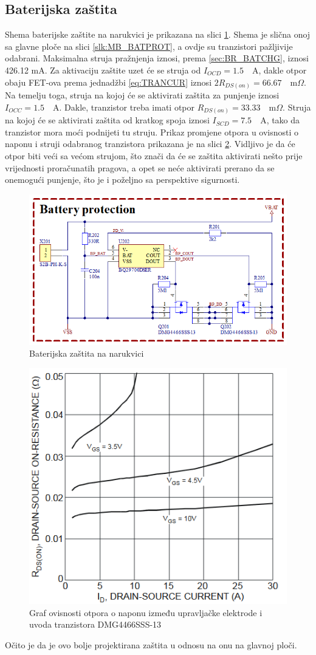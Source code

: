 \subsection{Baterijska zaštita}
\sloppy Shema baterijske zaštite na narukvici je prikazana na slici \ref{slk:BR_BATPROT}. Shema je slična onoj sa glavne ploče na slici \ref{slk:MB_BATPROT}, a ovdje su tranzistori pažljivije odabrani. Maksimalna struja pražnjenja iznosi, prema \ref{sec:BR_BATCHG}, iznosi 426.12 mA. Za aktivaciju zaštite uzet će se struja od $I_{OCD}=1.5\quad \textrm{A}$, dakle otpor obaju FET-ova prema jednadžbi \ref{eq:TRANCUR} iznosi ${2R_{DS(on)}=66.67\quad \textrm{m}\Omega}$. Na temelju toga, struja na kojoj će se aktivirati zaštita za punjenje iznosi $I_{OCC}=1.5\quad \textrm{A}$. Dakle, tranzistor treba imati otpor $R_{DS(on)}=33.33\quad \textrm{m}\Omega$. Struja na kojoj će se aktivirati zaštita od kratkog spoja iznosi $I_{SCD}=7.5\quad \textrm{A}$, tako da tranzistor mora moći podnijeti tu struju. Prikaz promjene otpora u ovisnosti o naponu i struji odabranog tranzistora prikazana je na slici \ref{slk:RDS_NEW}. Vidljivo je da će otpor biti veći sa većom strujom, što znači da će se zaštita aktivirati nešto prije vrijednosti proračunatih pragova, a opet se neće aktivirati prerano da se onemogući punjenje, što je i poželjno sa perspektive sigurnosti.
\begin{figure}[htb]
    \centering
    \includegraphics[width=10 cm]{Figures/BR_BATPROT.png}
    \caption{Baterijska zaštita na narukvici}
    \label{slk:BR_BATPROT}
\end{figure}
\begin{figure}[h!tb]
    \centering
    \includegraphics[width=6 cm]{Figures/RDS_NEW.PNG}
    \caption{Graf ovisnosti otpora o naponu između upravljačke elektrode i uvoda tranzistora DMG4466SSS-13 \cite{di:dmg4466}}
    \label{slk:RDS_NEW}
\end{figure}
Očito je da je ovo bolje projektirana zaštita u odnosu na onu na glavnoj ploči.

